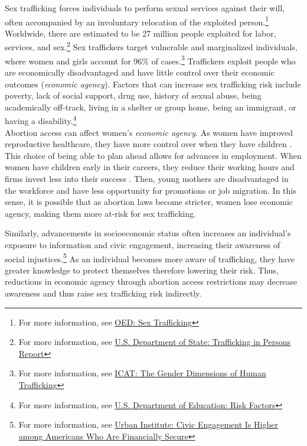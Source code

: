 
Sex trafficking forces individuals to perform sexual services against their will, often accompanied by an involuntary relocation of the exploited person.\footnote{For more information, see \href{https://www.oed.com/dictionary/sex-trafficking_n}{OED: Sex Trafficking}} Worldwide, there are estimated to be 27 million people exploited for labor, services, and sex.\footnote{For more information, see \href{https://www.state.gov/reports/2024-trafficking-in-persons-report/}{U.S. Department of State: Trafficking in Persons Report}} Sex traffickers target vulnerable and marginalized individuals, where women and girls account for 96\% of cases.\footnote{For more information, see \href{https://icat.un.org/sites/g/files/tmzbdl461/files/publications/icat-ib-04-v.1.pdf}{ICAT: The Gender Dimensions of Human Trafficking}} Traffickers exploit people who are economically disadvantaged and have little control over their economic outcomes (\textit{economic agency}). Factors that can increase sex trafficking risk include poverty, lack of social support, drug use, history of sexual abuse, being academically off-track, living in a shelter or group home, being an immigrant, or having a disability.\footnote{For more information, see \href{https://safesupportivelearning.ed.gov/human-trafficking-americas-schools/risk-factors}{U.S. Department of Education: Risk Factors}}  \\


Abortion access can affect women's \textit{economic agency}. As women have improved reproductive healthcare, they have more control over when they have children \citep{baileyandlindo}. This choice of being able to plan ahead allows for advances in employment. When women have children early in their careers, they reduce their working hours and firms invest less into their success \citep{BlauandKhan}. Then, young mothers are disadvantaged in the workforce and have less opportunity for promotions or job migration. In this sense, it is possible that as abortion laws become stricter, women lose economic agency, making them more at-risk for sex trafficking. 

Similarly, advancements in socioeconomic status often increases an individual’s exposure to information and civic engagement, increasing their awareness of social injustices.\footnote{For more information, see \href{https://www.urban.org/urban-wire/civic-engagement-higher-among-americans-who-are-financially-secure}{Urban Institute: Civic Engagement Is Higher among Americans Who Are Financially Secure}} As an individual becomes more aware of trafficking, they have greater knowledge to protect themselves therefore lowering their risk. Thus, reductions in economic agency through abortion access restrictions may decrease awareness and thus raise sex trafficking risk indirectly. 

